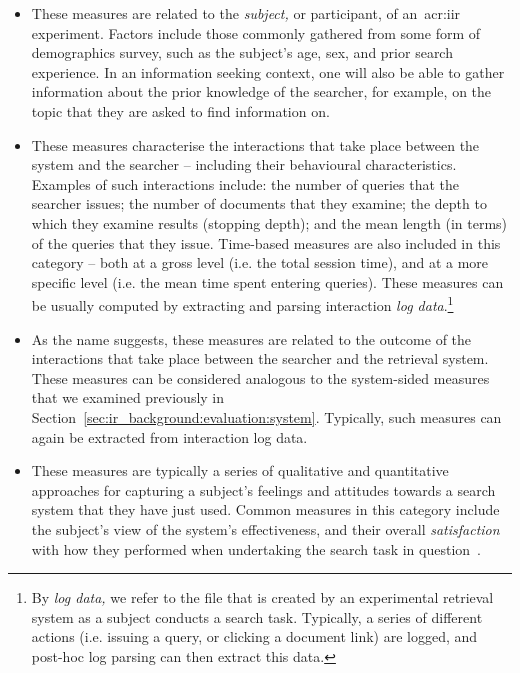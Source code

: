 \begin{itemize}
    \item{ These measures are related to the \emph{subject,} or participant, of an~\gls{acr:iir} experiment. Factors include those commonly gathered from some form of demographics survey, such as the subject's age, sex, and prior search experience. In an information seeking context, one will also be able to gather information about the prior knowledge of the searcher, for example, on the topic that they are asked to find information on.}
    
    \item{ These measures characterise the interactions that take place between the system and the searcher -- including their behavioural characteristics. Examples of such interactions include: the number of queries that the searcher issues; the number of documents that they examine; the depth to which they examine results (stopping depth); and the mean length (in terms) of the queries that they issue. Time-based measures are also included in this category -- both at a gross level (i.e. the total session time), and at a more specific level (i.e. the mean time spent entering queries). These measures can be usually computed by extracting and parsing interaction \emph{log data}.\footnote{By \emph{log data,} we refer to the file that is created by an experimental retrieval system as a subject conducts a search task. Typically, a series of different actions (i.e. issuing a query, or clicking a document link) are logged, and post-hoc log parsing can then extract this data.}}
    
    \item{ As the name suggests, these measures are related to the outcome of the interactions that take place between the searcher and the retrieval system. These measures can be considered analogous to the system-sided measures that we examined previously in Section~\ref{sec:ir_background:evaluation:system}. Typically, such measures can again be extracted from interaction log data.}
    
    \item{ These measures are typically a series of qualitative and quantitative approaches for capturing a subject's feelings and attitudes towards a search system that they have just used. Common measures in this category include the subject's view of the system's effectiveness, and their overall \emph{satisfaction} with how they performed when undertaking the search task in question~\citep{hornbaek2006usability}.}
\end{itemize}

